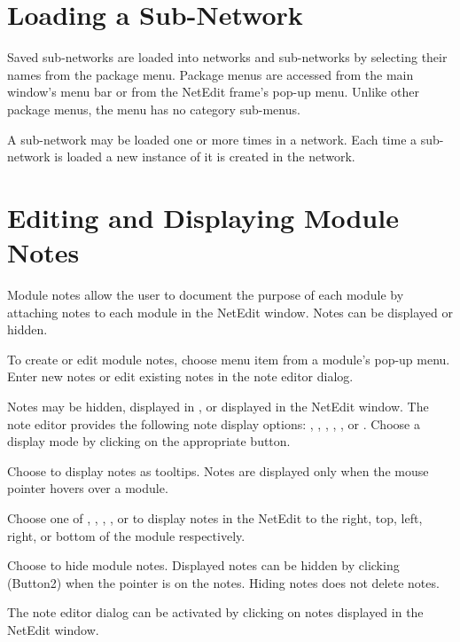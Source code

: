 \section{Loading a Sub-Network}
\label{sec:loadsubnet}

Saved sub-networks are loaded into networks and sub-networks by
selecting their names from the  package menu.
Package menus are accessed from the main window's menu bar or from the
NetEdit frame's pop-up menu.  Unlike other package menus, the
 menu has no category sub-menus.

A sub-network may be loaded one or more times in a network.  Each time
a sub-network is loaded a new instance of it is created in the
network.

\section{Editing and Displaying Module Notes}
\label{sec:modnotes}

Module notes allow the user to document the purpose of each module by
attaching notes to each module in the NetEdit window.  Notes can be
displayed or hidden.

To create or edit module notes, choose menu item  from
a module's pop-up menu. Enter new notes or edit existing notes in
the note editor dialog.

Notes may be hidden, displayed in , or displayed in the
NetEdit window.  The note editor provides the following note display
options: , , ,
, , or .  Choose a
display mode by clicking  on the appropriate button.

Choose  to display notes as tooltips.  Notes are
displayed only when the mouse pointer hovers over a module.

Choose one of , , ,
, or  to display notes in the
NetEdit to the right, top, left, right, or bottom of the module
respectively. 

Choose  to hide module notes.  Displayed notes can be
hidden by clicking \keyboard(Button2) when the pointer is on the
notes.  Hiding notes does not delete notes.

The note editor dialog can be activated by clicking 
on notes displayed in the NetEdit window.


